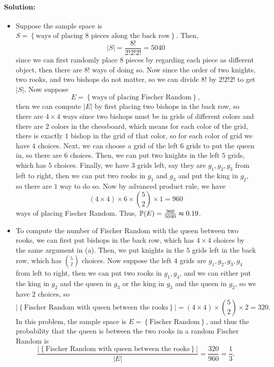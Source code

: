\documentclass[a4paper,12pt]{article}
\begin{document}
\paragraph{Solution:}
\begin{itemize}
	\item [(a)] Suppose the sample space is \(S = \left\{ \text{ways of placing } 8 \text{ pieces along the back row}   \right\} \). Then, 
	\[
		\vert S \vert = \frac{8!}{2!2!2!} = 5040 
	\]
	since we can first randomly place \(8\) pieces by regarding each piece as different object, then there are \(8!\) ways of doing so. Now since the order of two knights, two rooks, and two bishops do not matter, so we can divide \(8!\) by \(2!2!2!\) to get \(\vert S \vert \). Now suppose
	\[
		E = \left\{ \text{ways of placing Fischer Random}  \right\}, 
	\]
	then we can compute \(\vert E \vert \) by first placing two bishops in the back row, so there are \(4 \times 4\) ways since two bishops must be in grids of different colors and there are \(2\) colors in the chessboard, which means for each color of the grid, there is exactly \(1\) bishop in the grid of that color, so for each color of grid we have \(4\) choices. Next, we can choose a grid of the left \(6\) grids to put the queen in, so there are \(6\) choices. Then, we can put two knights in the left \(5\) grids, which has \(5\) choices. Finally, we have \(3\) grids left, say they are \(g_1, g_2, g_3\) from left to right, then we can put two rooks in \(g_1\) and \(g_3\) and put the king in \(g_2\), so there are \(1\) way to do so. Now by advanced product rule, we have 
	\[
		\left( 4 \times 4 \right) \times 6 \times \binom{5}{2} \times 1 = 960 
	\]              
	ways of placing Fischer Random. Thus, \(\mathbb{P} (E) = \frac{960}{5040} \thickapprox 0.19\). 
	\item [(b)] To compute the number of Fischer Random with the queen between two rooks, we can first put bishops in the back row, which has \(4 \times 4\) choices by the same argument in (a). Then, we put knights in the \(5\) grids left in the back row, which has \(\binom{5}{2}\) choices. Now suppose the left \(4\) grids are \(g_1, g_2, g_3, g_4\) from left to right, then we can put two rooks in \(g_1, g_4\), and we can either put the king in \(g_2\) and the queen in \(g_3\) or the king in \(g_3\) and the queen in \(g_2\), so we have \(2\) choices, so 
	\[
		\vert \left\{ \text{Fischer Random with queen between the rooks}  \right\}  \vert = (4 \times 4) \times \binom{5}{2} \times 2 = 320. 
	\]
	In this problem, the sample space is \(E = \left\{ \text{Fischer Random}  \right\} \), and thus the probability that the queen is between the two rooks in a random Fischer Random is 
	\[
		\frac{\vert \left\{ \text{Fischer Random with queen between the rooks} \right\}  \vert }{\vert E \vert } = \frac{320}{960} = \frac{1}{3}.
	\] 
\end{itemize}
\end{document}
